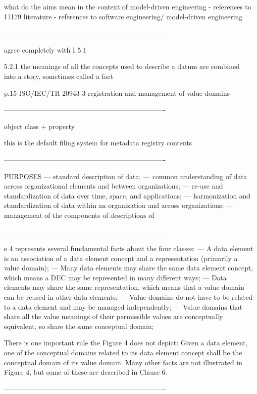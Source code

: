 what do the aims mean in the context of model-driven engineering 
 - references to 11179 literature 
 - references to software engineering/ model-driven engineering 

----------------------------------------------------------------------

agree completely with I 5.1 

5.2.1 the meanings of all the concepts used to describe a datum are
combined into a story, sometimes called a fact 

p.15 ISO/IEC/TR 20943-3 registration and management of value domains

----------------------------------------------------------------------

object class + property 

this is the default filing system for metadata registry contents 

----------------------------------------------------------------------

PURPOSES
— standard description of data;
— common understanding of data across organizational elements and between organizations;
— re-use and standardization of data over time, space, and applications;
— harmonization and standardization of data within an organization and across organizations;
— management of the components of descriptions of 

----------------------------------------------------------------------

e 4 represents several fundamental facts about the four classes:
— A data element is an association of a data element concept and a representation (primarily a
value domain);
 — Many data elements may share the same data element concept, which means a DEC may be represented in many different ways;
— Data elements may share the same representation, which means that a value domain can be reused in other data elements;
— Value domains do not have to be related to a data element and may be managed independently;
— Value domains that share all the value meanings of their permissible
values are conceptually equivalent, so share the same conceptual
domain;

There is one important rule the Figure 4 does not depict: Given a data element, one of the conceptual domains related to its data element concept shall be the conceptual domain of its value domain.
Many other facts are not illustrated in Figure 4, but some of these
are described in Clause 6. 

----------------------------------------------------------------------

